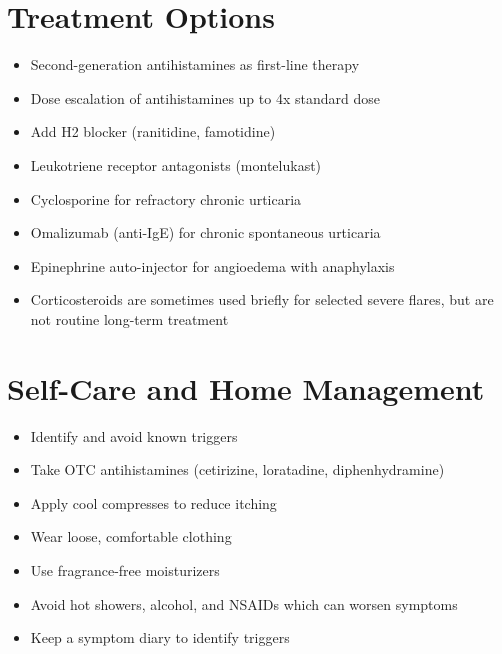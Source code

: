 \section*{Treatment Options}
\begin{itemize}
\item Second-generation antihistamines as first-line therapy
\item Dose escalation of antihistamines up to 4x standard dose
\item Add H2 blocker (ranitidine, famotidine)
\item Leukotriene receptor antagonists (montelukast)
\item Cyclosporine for refractory chronic urticaria
\item Omalizumab (anti-IgE) for chronic spontaneous urticaria
\item Epinephrine auto-injector for angioedema with anaphylaxis
\item Corticosteroids are sometimes used briefly for selected severe flares, but are not routine long-term treatment
\end{itemize}

\section*{Self-Care and Home Management}
\begin{itemize}
\item Identify and avoid known triggers
\item Take OTC antihistamines (cetirizine, loratadine, diphenhydramine)
\item Apply cool compresses to reduce itching
\item Wear loose, comfortable clothing
\item Use fragrance-free moisturizers
\item Avoid hot showers, alcohol, and NSAIDs which can worsen symptoms
\item Keep a symptom diary to identify triggers
\end{itemize}


